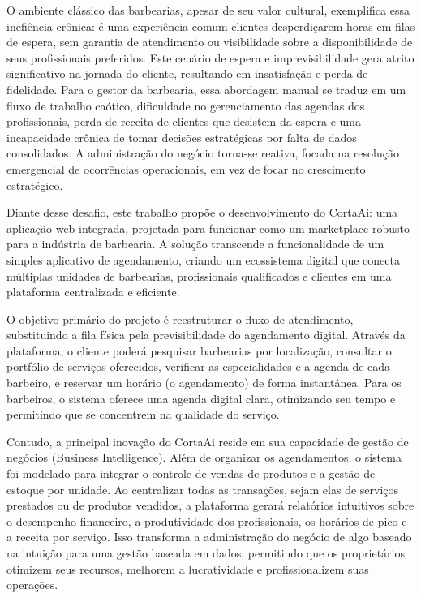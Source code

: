 \documentclass[
    12pt, 
    a4paper, 
    oneside, 
    chapter=TITLE, 
    section=TITLE
]{abntex2}
\begin{document}
O ambiente clássico das barbearias, apesar de seu valor cultural, exemplifica essa inefiência crônica: é uma experiência comum clientes desperdiçarem horas em filas de espera, sem garantia de atendimento ou visibilidade sobre a disponibilidade de seus profissionais preferidos. Este cenário de espera e imprevisibilidade gera atrito significativo na jornada do cliente, resultando em insatisfação e perda de fidelidade. Para o gestor da barbearia, essa abordagem manual se traduz em um fluxo de trabalho caótico, dificuldade no gerenciamento das agendas dos profissionais, perda de receita de clientes que desistem da espera e uma incapacidade crônica de tomar decisões estratégicas por falta de dados consolidados. A administração do negócio torna-se reativa, focada na resolução emergencial de ocorrências operacionais, em vez de focar no crescimento estratégico.

Diante desse desafio, este trabalho propõe o desenvolvimento do CortaAi: uma aplicação web integrada, projetada para funcionar como um marketplace robusto para a indústria de barbearia. A solução transcende a funcionalidade de um simples aplicativo de agendamento, criando um ecossistema digital que conecta múltiplas unidades de barbearias, profissionais qualificados e clientes em uma plataforma centralizada e eficiente.

O objetivo primário do projeto é reestruturar o fluxo de atendimento, substituindo a fila física pela previsibilidade do agendamento digital. Através da plataforma, o cliente poderá pesquisar barbearias por localização, consultar o portfólio de serviços oferecidos, verificar as especialidades e a agenda de cada barbeiro, e reservar um horário (o agendamento) de forma instantânea. Para os barbeiros, o sistema oferece uma agenda digital clara, otimizando seu tempo e permitindo que se concentrem na qualidade do serviço.

Contudo, a principal inovação do CortaAi reside em sua capacidade de gestão de negócios (Business Intelligence). Além de organizar os agendamentos, o sistema foi modelado para integrar o controle de vendas de produtos e a gestão de estoque por unidade. Ao centralizar todas as transações, sejam elas de serviços prestados ou de produtos vendidos, a plataforma gerará relatórios intuitivos sobre o desempenho financeiro, a produtividade dos profissionais, os horários de pico e a receita por serviço. Isso transforma a administração do negócio de algo baseado na intuição para uma gestão baseada em dados, permitindo que os proprietários otimizem seus recursos, melhorem a lucratividade e profissionalizem suas operações.
\end{document}

